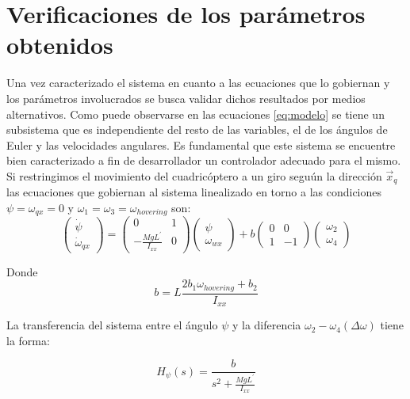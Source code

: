 \documentclass[main]{subfiles}
\begin{document}
\chapter{Verificaciones de los par\'ametros obtenidos}
\label{chap:verificaciones_modelado}

Una vez caracterizado el sistema en cuanto a las ecuaciones que lo gobiernan y los par\'ametros involucrados se busca validar dichos resultados por medios alternativos. Como puede observarse en las ecuaciones \ref{eq:modelo} se tiene un subsistema que es independiente del resto de las variables, el de los \'angulos de Euler y las velocidades angulares. Es fundamental que este sistema se encuentre bien caracterizado a fin de desarrollador un controlador adecuado para el mismo.\\ 

Si restringimos el movimiento del cuadric\'optero a un giro segu\'un la direcci\'on $\vec{x}_q$ las ecuaciones que gobiernan al sistema linealizado en torno a las condiciones $\psi = \omega_{qx} = 0$ y $\omega_1 = \omega_3 =\omega_{hovering}$ son:
\begin{equation}
\label{eq:mod_psi}
\left(\begin{array}{c}
\dot{\psi}\\
\dot{\omega}_{qx}
\end{array}\right) = \left(\begin{array}{cc}
0 & 1\\
-\frac{MgL^\prime}{I_{xx}} & 0
\end{array}\right)\left(\begin{array}{c}
\psi\\
\omega_{wx}
\end{array}\right) + b\left(\begin{array}{cc}
0 & 0\\
1 & -1
\end{array}\right)\left(\begin{array}{c}
\omega_2\\
\omega_4
\end{array}\right)
\end{equation}

Donde
\begin{equation}
b =L\frac{2b_1\omega_{hovering}+b_2}{I_{xx}}
\end{equation}

La transferencia del sistema entre el \'angulo $\psi$ y la diferencia $\omega_2-\omega_4 (\Delta \omega)$ tiene la forma:

\begin{equation}
\label{eq:trans_psi}
H_{\psi}(s) = \frac{b}{s^2+\frac{MgL^\prime}{I_{xx}}}
\end{equation}
\end{document}
